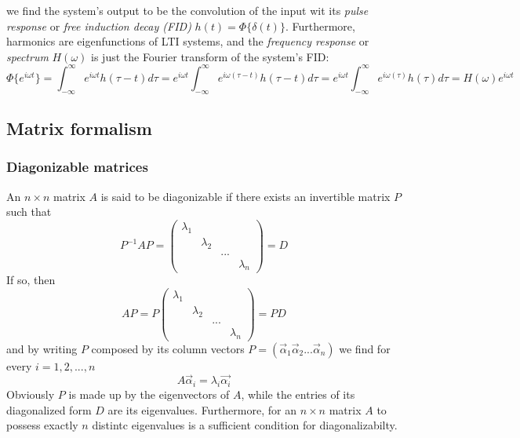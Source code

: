 \documentclass[11.5pt,a4paper]{article}
\begin{document}
we find the system's output to be the convolution of the input wit its \emph{pulse response} or \emph{free induction decay (FID)} $h(t) = \Phi\{\delta(t)\}$. 
Furthermore, harmonics are eigenfunctions of LTI systems, and the \emph{frequency response} or \emph{spectrum} $H(\omega)$ is just the Fourier transform of the system's FID:
\begin{equation}
	\Phi\{e^{i\omega t}\} = \int_{-\infty}^{\infty} e^{i\omega t} h(\tau-t) d\tau =  e^{i\omega t} \int_{-\infty}^{\infty} e^{i\omega (\tau-t)} h(\tau-t) d\tau =  e^{i\omega t} \int_{-\infty}^{\infty} e^{i\omega (\tau)} h(\tau) d\tau = H(\omega) e^{i \omega t}
\end{equation}

\subsection{Matrix formalism}

\subsubsection{Diagonizable matrices}
An $n \times n$ matrix $A$ is said to be diagonizable if there exists an invertible matrix $P$ such that
\begin{equation}
 P^{-1} A P = \begin{pmatrix} 
		\lambda_1 & & & \\
		& \lambda_2 & & \\
		& & \text{...} & \\
		& & & \lambda_n
              \end{pmatrix} = D
\end{equation}
If so, then 
\begin{equation}
 A P = P \begin{pmatrix} 
		\lambda_1 & & & \\
		& \lambda_2 & & \\
		& & \text{...} & \\
		& & & \lambda_n
              \end{pmatrix} = P D
\end{equation}
and by writing $P$ composed by its column vectors $P = ( \vec{\alpha}_1 \vec{\alpha}_2 ... \vec{\alpha}_n)$ we find for every $i = 1,2,...,n$
\begin{equation}
 A \vec{\alpha}_i = \lambda_i \vec{\alpha_i}
\end{equation}
Obviously $P$ is made up by the eigenvectors of $A$, while the entries of its diagonalized form $D$ are its eigenvalues. Furthermore, for an $n \times n$ matrix $A$ to possess exactly $n$ distintc eigenvalues is a sufficient condition for diagonalizabilty.
\end{document}
